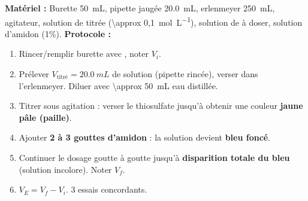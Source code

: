 \documentclass[11pt]{article}
\begin{document}
\begin{experience}
\textbf{Matériel :} Burette \SI{50}{mL}, pipette jaugée \SI{20,0}{mL}, erlenmeyer \SI{250}{mL}, agitateur, solution de  titrée (\SI{\approx 0,1}{mol.L^{-1}}), solution de  à doser, solution d'amidon (1\%).
\textbf{Protocole :}
\begin{enumerate}
\item Rincer/remplir burette avec , noter $V_i$.
\item Prélever $V_{\text{titré}} = \SI{20,0}{mL}$ de solution  (pipette rincée), verser dans l'erlenmeyer. Diluer avec \SI{\approx 50}{mL} eau distillée.
\item Titrer sous agitation : verser le thiosulfate jusqu'à obtenir une couleur \textbf{jaune pâle (paille)}.
\item Ajouter \textbf{2 à 3 gouttes d'amidon} : la solution devient \textbf{bleu foncé}.
\item Continuer le dosage goutte à goutte jusqu'à \textbf{disparition totale du bleu} (solution incolore). Noter $V_f$.
\item $V_E = V_f - V_i$. 3 essais concordants.
\end{enumerate}
\end{experience}
\end{document}
